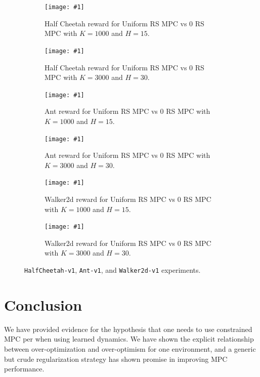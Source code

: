 \documentclass{article}
\begin{document}
\newcommand{\autosubfig}[3]{
  \begin{subfigure}[b]{0.48\columnwidth}
    \centering
    \texttt{[image: \#1]}
    \caption{#3}#2
  \end{subfigure}
}

\begin{figure}[!ht]
  \autosubfig{return-hc-hard.pdf}{\label{fig:return-hc-hard}}{Half Cheetah reward for Uniform RS MPC vs 0 RS MPC with $K=1000$ and $H=15$.}
  \autosubfig{long-return-hc-hard.pdf}{\label{fig:long-return-hc-hard}}{Half Cheetah reward for Uniform RS MPC vs 0 RS MPC with $K=3000$ and $H=30$.}

  \vspace{1em}

  \autosubfig{return-ant.pdf}{\label{fig:return-ant}}{Ant reward for Uniform RS MPC vs 0 RS MPC with $K=1000$ and $H=15$.}
  \autosubfig{long-return-ant.pdf}{\label{fig:long-return-ant}}{Ant reward for Uniform RS MPC vs 0 RS MPC with $K=3000$ and $H=30$.}

  \vspace{1em}

  \autosubfig{return-walker2d.pdf}{\label{fig:return-walker2d}}{Walker2d reward for Uniform RS MPC vs 0 RS MPC with $K=1000$ and $H=15$.}
  \autosubfig{long-return-walker2d.pdf}{\label{fig:long-return-walker2d}}{Walker2d reward for Uniform RS MPC vs 0 RS MPC with $K=3000$ and $H=30$.}

  \caption{\texttt{HalfCheetah-v1}, \texttt{Ant-v1}, and \texttt{Walker2d-v1} experiments.}
  \label{fig:multienv-experiments}
\end{figure}


\section{Conclusion}
We have provided evidence for the hypothesis that one needs to use constrained MPC per  when using learned dynamics. We have shown the explicit relationship between over-optimization and over-optimism for one environment, and a generic but crude regularization strategy has shown promise in improving MPC performance.
\end{document}

